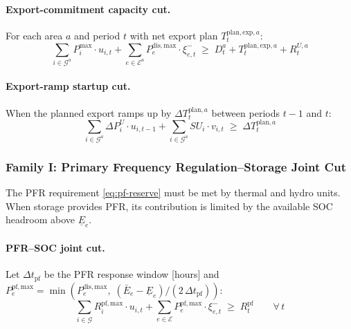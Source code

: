 \paragraph{Export-commitment capacity cut.}
For each area $a$ and period $t$ with net export plan $T^{\mathrm{plan,exp},a}_t$:
\begin{equation}\label{eq:cut-H-cap}
  \boxed{
    \sum_{i \in \mathcal{G}^a} P^{\max}_i \cdot u_{i,t}
    + \sum_{e \in \mathcal{E}^a} P^{\mathrm{dis,max}}_e \cdot \xi^-_{e,t}
    \;\geq\;
    D^a_t + T^{\mathrm{plan,exp},a}_t + R^{U,a}_t
  }
\end{equation}

\paragraph{Export-ramp startup cut.}
When the planned export ramps up by $\Delta T^{\mathrm{plan},a}_t$ between
periods $t-1$ and $t$:
\begin{equation}\label{eq:cut-H-ramp}
  \sum_{i \in \mathcal{G}^a} \Delta P^U_i \cdot u_{i,t-1}
  + \sum_{i \in \mathcal{G}^a} SU_i \cdot v_{i,t}
  \;\geq\; \Delta T^{\mathrm{plan},a}_t
\end{equation}

\subsubsection{Family I: Primary Frequency Regulation--Storage Joint Cut}
\label{sec:cut-I}

The PFR requirement \eqref{eq:pf-reserve} must be met by thermal and hydro
units.  When storage provides PFR, its contribution is limited by the
available SOC headroom above $\underline{E}_e$.

\paragraph{PFR--SOC joint cut.}
Let $\Delta t_{\mathrm{pf}}$ be the PFR response window [hours] and
$P^{\mathrm{pf,max}}_e = \min(P^{\mathrm{dis,max}}_e,\; (\bar{E}_e -
\underline{E}_e)/(2\,\Delta t_{\mathrm{pf}}))$:
\begin{equation}\label{eq:cut-I-pfr}
  \boxed{
    \sum_{i \in \mathcal{G}} R^{\mathrm{pf,max}}_i \cdot u_{i,t}
    + \sum_{e \in \mathcal{E}} P^{\mathrm{pf,max}}_e \cdot \xi^-_{e,t}
    \;\geq\; R^{\mathrm{pf}}_t
    \qquad \forall\, t
  }
\end{equation}


